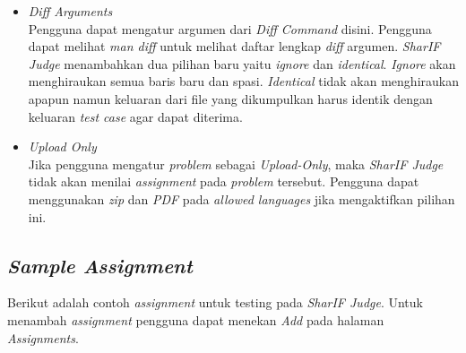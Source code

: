 \begin{itemize}
	\item \textit{Diff Arguments} \\
	Pengguna dapat mengatur argumen dari \textit{Diff Command} disini. Pengguna dapat melihat \textit{man diff} untuk melihat daftar lengkap \textit{diff} argumen. \textit{SharIF Judge} menambahkan dua pilihan baru yaitu \textit{ignore} dan \textit{identical}. \textit{Ignore} akan menghiraukan semua baris baru dan spasi. \textit{Identical} tidak akan menghiraukan apapun namun keluaran dari file yang dikumpulkan harus identik dengan keluaran \textit{test case} agar dapat diterima.
	
	\item \textit{Upload Only} \\
	Jika pengguna mengatur \textit{problem} sebagai \textit{Upload-Only}, maka \textit{SharIF Judge} tidak akan menilai \textit{assignment} pada \textit{problem} tersebut. Pengguna dapat menggunakan \textit{zip} dan \textit{PDF} pada \textit{allowed languages} jika mengaktifkan pilihan ini.
	
\end{itemize}

\subsection{\textit{Sample Assignment}}
\label{sec:sample_assignment}
Berikut adalah contoh \textit{assignment} untuk testing pada \textit{SharIF Judge}. Untuk menambah \textit{assignment} pengguna dapat menekan \textit{Add} pada halaman \textit{Assignments}.


